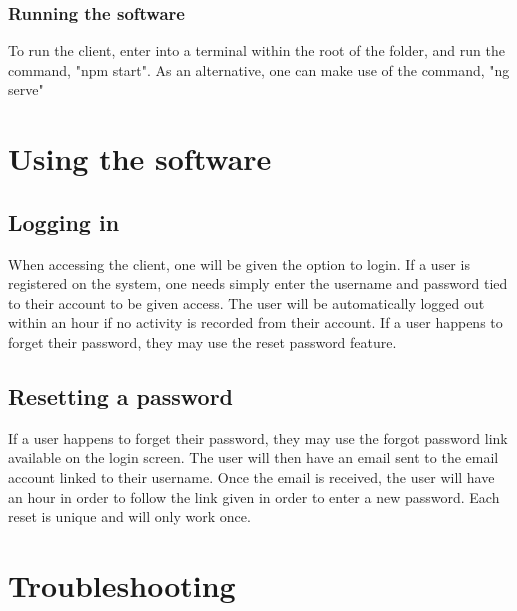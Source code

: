 \documentclass[a4paper,12pt]{article}
\begin{document}
     		\subsubsection {Running the software}
     		
	     	To run the client, enter into a terminal within the root of the folder, and run the command, "npm start". As an alternative, one can make use of the command, "ng serve"
    
    \pagebreak
    
    \section{Using the software}
    
    	\subsection{Logging in}
    	
    	When accessing the client, one will be given the option to login. If a user is registered on the system, one needs simply enter the username and password tied to their account to be given access. The user will be automatically logged out within an hour if no activity is recorded from their account. If a user happens to forget their password, they may use the reset password feature.
    	
   		\subsection{Resetting a password}
    	
    	If a user happens to forget their password, they may use the forgot password link available on the login screen. The user will then have an email sent to the email account linked to their username. Once the email is received, the user will have an hour in order to follow the link given in order to enter a new password. Each reset is unique and will only work once.
    
    \pagebreak
     
    \section{Troubleshooting}
    
\end{document}
